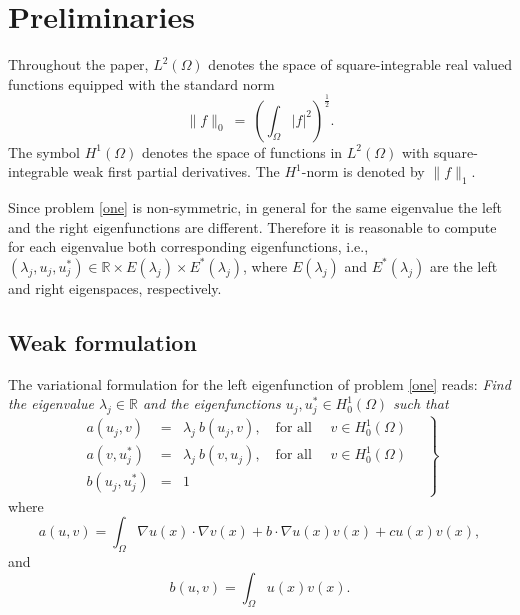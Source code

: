 \documentclass[smallextended]{svjour3}
\begin{document}

\section{Preliminaries}\label{sec:preli}

Throughout the paper, $L^2(\Omega)$
denotes the space of square-integrable real valued functions
equipped with the standard norm
\begin{equation}\label{eq:l2}
\|f\|_{0}\ = \ \left(\int_\Omega  |f|^2\right)^{\frac{1}{2}} .
\end{equation}
The symbol $H^1(\Omega)$ denotes the space of functions in $L^2(\Omega)$
with square-integrable weak first partial derivatives. The $H^1$-norm is 
denoted by $\|f\|_1$.

Since problem \eqref{one} is non-symmetric, in general for the same eigenvalue the left and the right eigenfunctions are different. 
Therefore it is reasonable to compute for each eigenvalue both corresponding eigenfunctions, i.e., 
$(\lambda_j,u_j,u_j^*)\in \mathbb{R}\times E(\lambda_j)\times E^*(\lambda_j)$, where $E(\lambda_j)$ 
and $E^*(\lambda_j)$ are the left and right eigenspaces, respectively.

\subsection{Weak formulation}

The variational formulation for the left eigenfunction of problem \eqref{one} reads:
\emph{Find the eigenvalue $\lambda_j\in \mathbb{R}$ and the eigenfunctions $u_j,u_j^*\in H^1_0(\Omega)$
such that}
\begin{equation}
\label{eq:var_prob}
\left.
\begin{array}{lcl}
a(u_j,v)&=& \lambda_j\ b(u_j,v),
\quad \text{for all } \quad v  \in H^1_0(\Omega)\\
a(v,u_j^*)&=& \lambda_j\ b(v,u_j),
\quad \text{for all } \quad v  \in H^1_0(\Omega)\\
 b(u_j,u_j^*) &=& 1
\end{array}\quad
\right\}
\end{equation}
where
\begin{equation}\label{eq:a}
a(u,v)=\int_\Omega \nabla u(x)\cdot \nabla v(x) + b\cdot \nabla u(x) v(x) + cu(x)v(x),
\end{equation}
and
\begin{equation}\label{eq:b}
b(u,v)=\int_\Omega u(x) v(x).
\end{equation}
\end{document}
